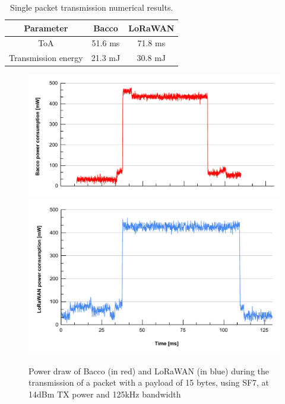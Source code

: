\begin{table}[ht]
    \caption{Single packet transmission numerical results.}
    \label{tab: energy results}
    \centering
    \setlength{\extrarowheight}{7pt}
    \begin{tabular}{ |c|c|c| }
        \hline
        \textbf{Parameter} & \textbf{Bacco} & \textbf{LoRaWAN}\\
        \hline
        ToA & 51.6 ms & 71.8 ms\\
        Transmission energy & 21.3 mJ & 30.8 mJ\\
        \hline
    \end{tabular}
\end{table}

\begin{figure}[ht]
    \centering
    \includegraphics[width=1.0\textwidth]{images/bacco_SF7_14dbm_125khz_power.pdf}\\
    \vspace{-0.7cm}
    \includegraphics[width=1.0\textwidth]{images/lorawan_SF7_14dbm_125khz_power.pdf}
    \caption{Power draw of Bacco (in red) and LoRaWAN (in blue) during the transmission of a packet with a payload of 15
    bytes, using SF7, at 14dBm TX power and 125kHz bandwidth}
    \label{img: packet}
\end{figure}

